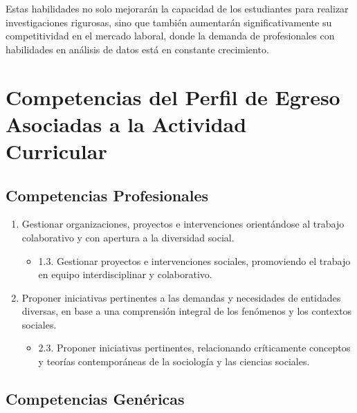 \documentclass[11pt,letter,]{article}
\providecommand{\tightlist}{%
  \setlength{\itemsep}{0pt}\setlength{\parskip}{0pt}}
\begin{document}
Estas habilidades no solo mejorarán la capacidad de los estudiantes para
realizar investigaciones rigurosas, sino que también aumentarán
significativamente su competitividad en el mercado laboral, donde la
demanda de profesionales con habilidades en análisis de datos está en
constante crecimiento.

\hypertarget{competencias-del-perfil-de-egreso-asociadas-a-la-actividad-curricular}{%
\section{Competencias del Perfil de Egreso Asociadas a la Actividad
Curricular}\label{competencias-del-perfil-de-egreso-asociadas-a-la-actividad-curricular}}

\hypertarget{competencias-profesionales}{%
\subsection{Competencias
Profesionales}\label{competencias-profesionales}}

\begin{enumerate}
\def\labelenumi{\arabic{enumi}.}
\tightlist
\item
  Gestionar organizaciones, proyectos e intervenciones orientándose al
  trabajo colaborativo y con apertura a la diversidad social.

  \begin{itemize}
  \tightlist
  \item
    1.3. Gestionar proyectos e intervenciones sociales, promoviendo el
    trabajo en equipo interdisciplinar y colaborativo.
  \end{itemize}
\item
  Proponer iniciativas pertinentes a las demandas y necesidades de
  entidades diversas, en base a una comprensión integral de los
  fenómenos y los contextos sociales.

  \begin{itemize}
  \tightlist
  \item
    2.3. Proponer iniciativas pertinentes, relacionando críticamente
    conceptos y teorías contemporáneas de la sociología y las ciencias
    sociales.
  \end{itemize}
\end{enumerate}

\hypertarget{competencias-genuxe9ricas}{%
\subsection{Competencias Genéricas}\label{competencias-genuxe9ricas}}
\end{document}
